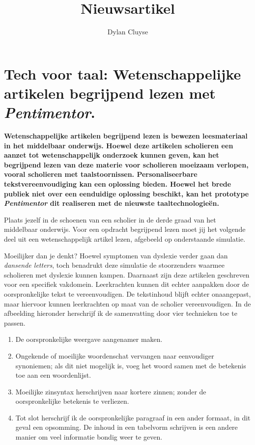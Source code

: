 \documentclass[a4paper,9pt,twoside]{report}
\title{Nieuwsartikel}
\author{Dylan {Cluyse}}
\begin{document}
	
\chapter{Tech voor taal: Wetenschappelijke artikelen begrijpend lezen met \textit{Pentimentor}.}

\noindent\textbf{Wetenschappelijke artikelen begrijpend lezen is bewezen leesmateriaal in het middelbaar onderwijs. Hoewel deze artikelen scholieren een aanzet tot wetenschappelijk onderzoek kunnen geven, kan het begrijpend lezen van deze materie voor scholieren moeizaam verlopen, vooral scholieren met taalstoornissen. Personaliseerbare tekstvereenvoudiging kan een oplossing bieden. Hoewel het brede publiek niet over een eenduidige oplossing beschikt, kan het prototype \textit{Pentimentor} dit realiseren met de nieuwste taaltechnologieën.}

\medspace

\noindent Plaats jezelf in de schoenen van een scholier in de derde graad van het middelbaar onderwijs. Voor een opdracht begrijpend lezen moet jij het volgende deel uit een wetenschappelijk artikel lezen, afgebeeld op onderstaande simulatie.

\begin{figure}[H]
\end{figure}

\noindent Moeilijker dan je denkt? Hoewel symptomen van dyslexie verder gaan dan \textit{dansende letters}, toch benadrukt deze simulatie de stoorzenders waarmee scholieren met dyslexie kunnen kampen. Daarnaast zijn deze artikelen geschreven voor een specifiek vakdomein. Leerkrachten kunnen dit echter aanpakken door de oorspronkelijke tekst te vereenvoudigen. De tekstinhoud blijft echter onaangepast, maar hiervoor kunnen leerkrachten op maat van de scholier vereenvoudigen. In de afbeelding hieronder herschrijf ik de samenvatting door vier technieken toe te passen. 

\begin{enumerate}
	\item De oorspronkelijke weergave aangenamer maken. 
	\item Ongekende of moeilijke woordenschat vervangen naar eenvoudiger synoniemen; als dit niet mogelijk is, voeg het woord samen met de betekenis toe aan een woordenlijst.
	\item Moeilijke zinsyntax herschrijven naar kortere zinnen; zonder de oorspronkelijke betekenis te verliezen.
	\item Tot slot herschrijf ik de oorspronkelijke paragraaf in een ander formaat, in dit geval een opsomming. De inhoud in een tabelvorm schrijven is een andere manier om veel informatie bondig weer te geven.
\end{enumerate}
\end{document}
